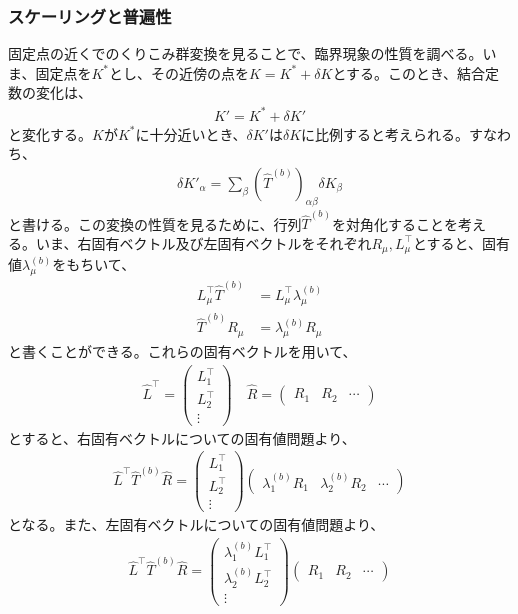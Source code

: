 \documentclass[a4paper,11pt]{jsarticle}
\numberwithin{equation}{section}
\begin{document}
\subsubsection{スケーリングと普遍性}
固定点の近くでのくりこみ群変換を見ることで、臨界現象の性質を調べる。いま、固定点を$K^*$とし、その近傍の点を$K = K^* + \delta K$とする。このとき、結合定数の変化は、
\begin{align}
    K' = K^* + \delta K' 
\end{align}
と変化する。$K$が$K^*$に十分近いとき、$\delta K'$は$\delta K$に比例すると考えられる。すなわち、
\begin{align}
    \delta K' _{\alpha} = \sum_{\beta}(\hat{T}^{(b)})_{\alpha \beta} \delta K_{\beta}
\end{align}
と書ける。この変換の性質を見るために、行列$\hat{T}^{(b)}$を対角化することを考える。いま、右固有ベクトル及び左固有ベクトルをそれぞれ$R_{\mu}, L_{\mu}^{\top}$とすると、固有値$\lambda_{\mu}^{(b)}$をもちいて、
\begin{align}
    L_{\mu}^{\top} \hat{T}^{(b)} &= L_{\mu}^{\top} \lambda_{\mu}^{(b)}\\
    \hat{T}^{(b)} R_{\mu} &= \lambda_{\mu}^{(b)} R_{\mu}
\end{align}
と書くことができる。これらの固有ベクトルを用いて、
\begin{align}
    \hat{L}^{\top} = 
    \begin{pmatrix}
        L_1^{\top} \\
        L_2^{\top} \\
        \vdots
    \end{pmatrix}
    \quad 
    \hat{R} =
    \begin{pmatrix}
        R_1 & R_2 & \cdots
    \end{pmatrix}
\end{align}
とすると、右固有ベクトルについての固有値問題より、
\begin{align}
    \hat{L}^{\top} \hat{T}^{(b)} \hat{R} =
    \begin{pmatrix}
        L_1^{\top}\\
        L_2^{\top}\\
        \vdots
    \end{pmatrix}
    \begin{pmatrix}
        \lambda_1^{(b)} R_1 & \lambda_2^{(b)} R_2 & \cdots
    \end{pmatrix}
\end{align}
となる。また、左固有ベクトルについての固有値問題より、
\begin{align}
    \hat{L}^{\top} \hat{T}^{(b)} \hat{R} =
    \begin{pmatrix}
        \lambda_1^{(b)} L_1^{\top}\\
        \lambda_2^{(b)} L_2^{\top}\\
        \vdots
    \end{pmatrix}
    \begin{pmatrix}
        R_1 & R_2 & \cdots
    \end{pmatrix}
\end{align}
\end{document}
